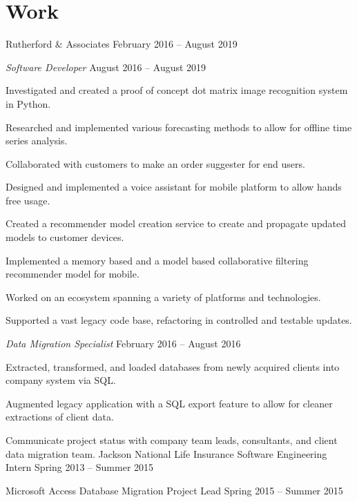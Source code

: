 \documentclass{marvinkassabian_resume}
\begin{document}
	\section{Work}
		\subsectiondate
				{Rutherford \& Associates}
				{February 2016 – August 2019}
			\resumesublistbegin
				\item[] \subsectiondate
						{\textit{Software Developer}}
						{August 2016 – August 2019}
					\resumesublistbegin
						\item Investigated and created a proof of concept dot matrix image recognition system in Python.
						\item Researched and implemented various forecasting methods to allow for offline time series analysis.
						\item Collaborated with customers to make an order suggester for end users.
						\item Designed and implemented a voice assistant for mobile platform to allow hands free usage. 
						\item Created a recommender model creation service to create and propagate updated models to customer devices.
						\item Implemented a memory based and a model based collaborative filtering recommender model for mobile.
						\item Worked on an ecosystem spanning a variety of platforms and technologies.
						\item Supported a vast legacy code base, refactoring in controlled and testable updates.
					\resumesublistend
				\item[] \subsectiondate
						{\textit{Data Migration Specialist}}
						{February 2016 – August 2016}
					\resumesublistbegin
						\item Extracted, transformed, and loaded databases from newly acquired clients into company system via SQL.
						\item Augmented legacy \cpp application with a SQL export feature to allow for cleaner extractions of client data.
						\item Communicate project status with company team leads, consultants, and client data migration team.
					\resumesublistend
			\resumesublistend
		\subsectionpositiondate
				{Jackson National Life Insurance}
				{Software Engineering Intern}
				{Spring 2013 – Summer 2015}
			\resumesublistbegin
				\item[] \subsectionlocationdate
						{Microsoft Access Database Migration}
						{Project Lead}
						{Spring 2015 – Summer 2015}
\end{document}

